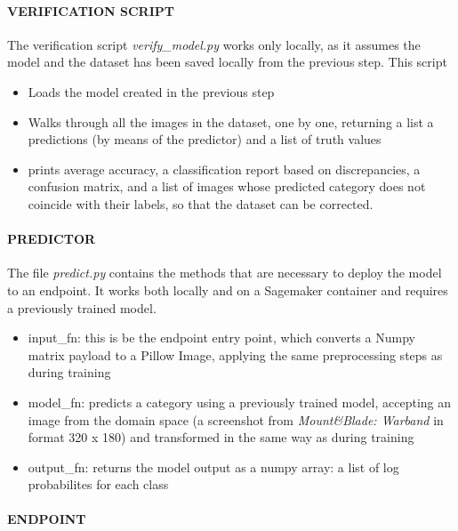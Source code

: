 \documentclass[
]{article}
\providecommand{\tightlist}{%
  \setlength{\itemsep}{0pt}\setlength{\parskip}{0pt}}
\begin{document}
\hypertarget{verification-script}{%
\paragraph{VERIFICATION SCRIPT}\label{verification-script}}

The verification script \emph{verify\_model.py} works only locally, as
it assumes the model and the dataset has been saved locally from the previous
step. This script

\begin{itemize}
\tightlist
\item
  Loads the model created in the previous step
\item
  Walks through all the images in the dataset, one by one, returning a list a predictions (by means of the predictor)  and a list of truth values
\item
  prints average accuracy, a classification report based on
  discrepancies, a confusion matrix, and a list of images whose
  predicted category does not coincide with their labels, so that the
  dataset can be corrected.
\end{itemize}

\hypertarget{predictor}{%
\paragraph{PREDICTOR}\label{predictor}}

The file \emph{predict.py} contains the methods that are necessary to
deploy the model to an endpoint. It works both locally and on a
Sagemaker container and requires a previously trained model.

\begin{itemize}
\tightlist
\item
  input\_fn: this is be the endpoint entry point, which converts a Numpy
  matrix payload to a Pillow Image, applying the same preprocessing
  steps as during training
\item
  model\_fn: predicts a category using a previously trained model,
  accepting an image from the domain space (a screenshot from
  \emph{Mount\&Blade: Warband} in format 320 x 180) and transformed in
  the same way as during training
\item
  output\_fn: returns the model output as a numpy array: a list of log
  probabilites for each class
\end{itemize}

\hypertarget{endpoint}{%
\paragraph{ENDPOINT}\label{endpoint}}
\end{document}
